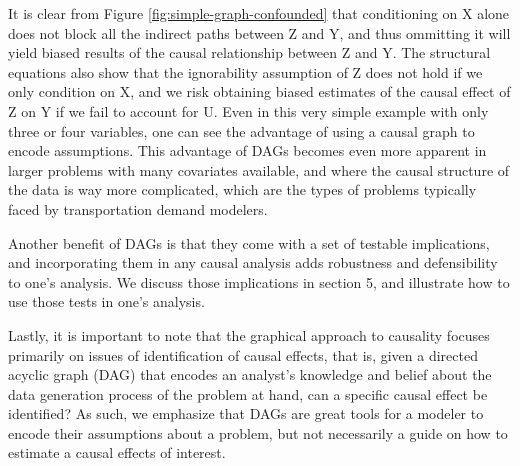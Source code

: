 It is clear from Figure \ref{fig:simple-graph-confounded} that conditioning on X alone does not block all the indirect paths between Z and Y, and thus ommitting it will yield biased results of the causal relationship between Z and Y. 
The structural equations also show that the ignorability assumption 
of Z does not hold if we only condition on X, and we risk obtaining biased estimates of the causal effect of Z on Y if we fail to 
account for U. 
Even in this very simple example with only three or four variables, one can see the advantage of using a causal graph to encode assumptions. 
This advantage of DAGs becomes even more apparent in larger problems with many covariates available, and where the causal structure of the data is way more complicated, which are the types of problems typically faced by transportation demand modelers. 

Another benefit of DAGs is that they come with a set of testable implications, and incorporating them in any causal 
analysis adds robustness and defensibility to one's analysis. 
We discuss those implications in section 5, and illustrate how to use those tests in one's analysis.

Lastly, it is important to note that the graphical approach to causality focuses 
primarily on issues of identification of causal effects, that is, given a 
directed acyclic graph (DAG) that encodes an analyst's knowledge and belief 
about the data generation process of the problem at hand, can a specific 
causal effect be identified? 
As such, we emphasize that DAGs are great tools 
for a modeler to encode their assumptions about a problem, but not necessarily 
a guide on how to estimate a causal effects of interest. 






